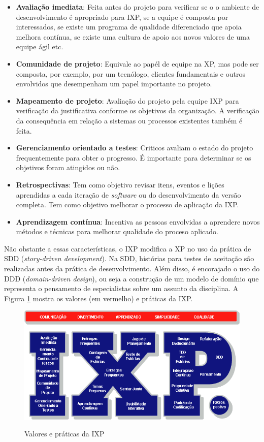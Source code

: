 \begin{itemize}
	\item \textbf{Avaliação imediata}: Feita antes do projeto para verificar se o o ambiente de desenvolvimento é apropriado para IXP, se a equipe é composta por interessados, se existe um programa de qualidade diferenciado que apoia melhora contínua, se existe uma cultura de apoio aos novos valores de uma equipe ágil etc.
	\item \textbf{Comunidade de projeto}: Equivale ao papél de equipe na XP, mas pode ser composta, por exemplo, por um tecnólogo, clientes fundamentais e outros envolvidos que desempenham um papel importante no projeto.
	\item \textbf{Mapeamento de projeto}: Avaliação do projeto pela equipe IXP para verificação da justificativa conforme os objetivos da organização. A verificação da consequência em relação a sistemas ou processos existentes também é feita.
	\item \textbf{Gerenciamento orientado a testes}: Criticos avaliam o estado do projeto frequentemente para obter o progresso. É importante para determinar se os objetivos foram atingidos ou não.
	\item \textbf{Retrospectivas}: Tem como objetivo revisar itens, eventos e lições aprendidas a cada iteração de \textit{software} ou do desenvolvimento da versão completa. Tem como objetivo melhorar o processo de aplicação da IXP.
	\item \textbf{Aprendizagem contínua}: Incentiva as pessoas envolvidas a aprendere novos métodos e técnicas para melhorar qualidade do proceso aplicado.
\end{itemize}

Não obstante a essas características, o IXP modifica a XP no uso da prática de SDD (\textit{story-driven development}). Na SDD, histórias para testes de aceitação são realizadas antes da prática de desenvolvimento. Além disso, é encorajado o uso do DDD (\textit{domain-driven design}), ou seja a construção de um modelo de domínio que representa o pensamento de especialistas sobre um assunto da disciplina. A Figura \ref{fig:ixp} mostra os valores (em vermelho) e práticas da IXP.

\begin{figure}[htb!]
\begin{center}
\caption{Valores e práticas da IXP}
\label{fig:ixp}
\includegraphics[width=14cm]{assets/ixp} \\
\end{center}
\end{figure}

